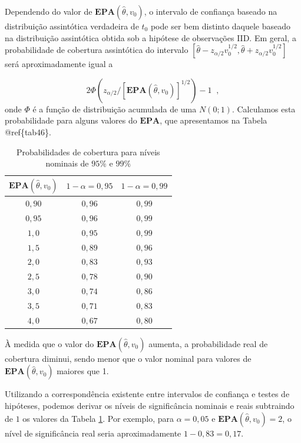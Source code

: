 \documentclass[]{book}
\numberwithin{example}{chapter}
\numberwithin{remark}{chapter}
\numberwithin{definition}{chapter}
\begin{document}
Dependendo do valor de \(\mathbf{EPA}\left( \hat{\theta},v_{0}\right)\),
o intervalo de confiança baseado na distribuição assintótica verdadeira
de \(t_{0}\) pode ser bem distinto daquele baseado na distribuição
assintótica obtida sob a hipótese de observações IID. Em geral, a
probabilidade de cobertura assintótica do intervalo
\(\left[\hat{\theta}-z_{\alpha /2}v_{0}^{1/2}, \hat{\theta}+z_{\alpha/2}v_{0}^{1/2}\right]\)
será aproximadamente igual a

\[
2\Phi \left( z_{\alpha /2}/\left[ \mathbf{EPA}\left( \hat{\theta}
,v_{0}\right) \right] ^{1/2}\right) -1\;\;, 
\] onde \(\Phi\) é a função de distribuição acumulada de uma
\(N\left( 0;1\right)\). Calculamos esta probabilidade para alguns
valores do \(\mathbf{EPA}\), que apresentamos na Tabela @ref\{tab46\}.

\begin{center}
\begin{table}[tbp] \centering
\caption{Probabilidades de cobertura para níveis nominais de $95\%$ e
$99\%$}\bigskip \label{tab46}
\begin{tabular}{|c|c|c|}
\hline\hline
$\mathbf{EPA}\left( \hat{\theta},v_{0}\right)$ & $1-\alpha =0,95$&
$1-\alpha =0,99$ \\ \hline\hline
$0,90$ & $0,96$ & $0,99$ \\
$0,95$ & $0,96$ & $0,99$ \\
$1,0$ & $0,95$ & $0,99$ \\
$1,5$ & $0,89$ & $0,96$ \\
$2,0$ & $0,83$ & $0,93$ \\
$2,5$ & $0,78$ & $0,90$ \\
$3,0$ & $0,74$ & $0,86$ \\
$3,5$ & $0,71$ & $0,83$ \\
$4,0$ & $0,67$ & $0,80$ \\ \hline\hline
\end{tabular}
\end{table}
\end{center}

À medida que o valor do \(\mathbf{EPA}\left( \hat{\theta},v_{0}\right)\)
aumenta, a probabilidade real de cobertura diminui, sendo menor que o
valor nominal para valores de
\(\mathbf{EPA}\left( \hat{\theta},v_{0}\right)\) maiores que 1.

Utilizando a correspondência existente entre intervalos de confiança e
testes de hipóteses, podemos derivar os níveis de significância nominais
e reais subtraindo de \(1\) os valores da Tabela \ref{tab46}. Por
exemplo, para \(\alpha =0,05\) e
\(\mathbf{EPA}\left( \hat{\theta},v_{0}\right) =2\), o nível de
significância real seria aproximadamente \(1-0,83=0,17\).
\end{document}
